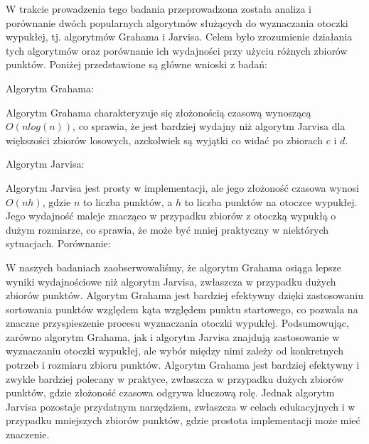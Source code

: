 W trakcie prowadzenia tego badania przeprowadzona została analiza i porównanie dwóch popularnych algorytmów służących do wyznaczania otoczki wypukłej, tj. algorytmów Grahama i Jarvisa. Celem było zrozumienie działania tych algorytmów oraz porównanie ich wydajności przy użyciu różnych zbiorów punktów. 
Poniżej przedstawione są główne wnioski z  badań:
\par
Algorytm Grahama:

Algorytm Grahama charakteryzuje się złożonością czasową wynoszącą $O(nlog(n))$, co sprawia, że jest bardziej wydajny niż algorytm Jarvisa dla większości zbiorów losowych, azckolwiek są 
wyjątki co widać po zbiorach $c$ i $d$.

\par
Algorytm Jarvisa:

Algorytm Jarvisa jest prosty w implementacji, ale jego złożoność czasowa wynosi $O(nh)$, gdzie $n$ to liczba punktów, a $h$ to liczba punktów na otoczce wypukłej.
Jego wydajność maleje znacząco w przypadku zbiorów z otoczką wypukłą o dużym rozmiarze, co sprawia, że może być mniej praktyczny w niektórych sytuacjach.
Porównanie:

W naszych badaniach zaobserwowaliśmy, że algorytm Grahama osiąga lepsze wyniki wydajnościowe niż algorytm Jarvisa, zwłaszcza w przypadku dużych zbiorów punktów.
Algorytm Grahama jest bardziej efektywny dzięki zastosowaniu sortowania punktów względem kąta względem punktu startowego, co pozwala na znaczne przyspieszenie procesu wyznaczania otoczki wypukłej.
Podsumowując, zarówno algorytm Grahama, jak i algorytm Jarvisa znajdują zastosowanie w wyznaczaniu otoczki wypukłej, ale wybór między nimi zależy od konkretnych potrzeb i rozmiaru zbioru punktów. Algorytm Grahama jest bardziej efektywny i zwykle bardziej polecany w praktyce, zwłaszcza w przypadku dużych zbiorów punktów, gdzie złożoność czasowa odgrywa kluczową rolę. Jednak algorytm Jarvisa pozostaje przydatnym narzędziem, zwłaszcza w celach edukacyjnych i w przypadku mniejszych zbiorów punktów, gdzie prostota implementacji może mieć znaczenie.




